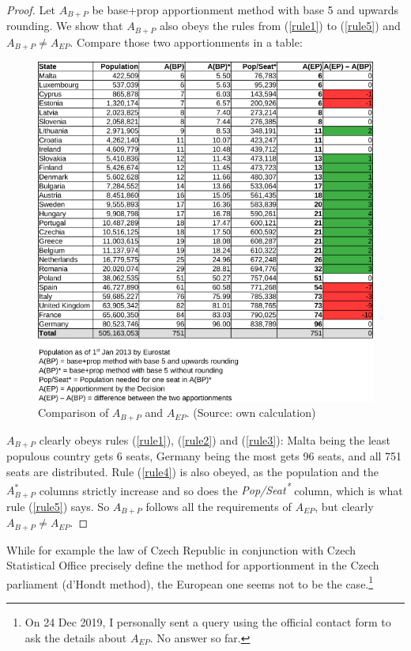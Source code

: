 \documentclass[a4paper]{article}
\theoremstyle{definition}
\begin{document}
\begin{proof}
	Let $A_{B+P}$ be base+prop apportionment method with base 5 and upwards rounding. We show that $A_{B+P}$ also obeys the rules from (\ref{rule1}) to (\ref{rule5}) and $A_{B+P} \ne A_{EP}$. Compare those two apportionments in a table:
	\begin{figure}[th!]
		\begin{center}
			\includegraphics[scale=0.47]{g5202.png}
			\caption{Comparison of $A_{B+P}$ and $A_{EP}$. (Source: own calculation)}
			\label{fig:fig1}
		\end{center}
	\end{figure}

	$A_{B+P}$ clearly obeys rules (\ref{rule1}), (\ref{rule2}) and (\ref{rule3}): Malta being the least populous country gets 6 seats, Germany being the most gets 96 seats, and all 751 seats are distributed. Rule (\ref{rule4}) is also obeyed, as the population and the $A_{B+P}^*$ columns strictly increase and so does the \textit{Pop/Seat\textsuperscript{*}} column, which is what rule (\ref{rule5}) says. So $A_{B+P}$ follows all the requirements of $A_{EP}$, but clearly $A_{B+P} \ne A_{EP}$.
\end{proof}

While for example the law of Czech Republic in conjunction with Czech Statistical Office precisely define the method for apportionment in the Czech parliament\textsuperscript{\cite{csu}} (d'Hondt method\textsuperscript{\cite{dhondt}}), the European one seems not to be the case.\footnote{On 24 Dec 2019, I personally sent a query using the official contact form to ask the details about $A_{EP}$. No answer so far.}
\end{document}
